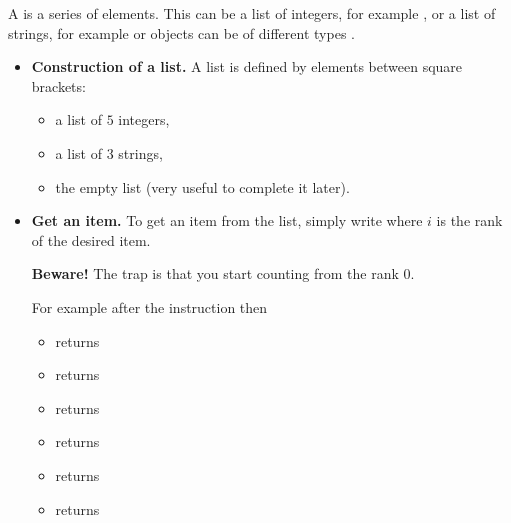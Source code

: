 \documentclass[11pt,class=report,crop=false]{standalone}
\begin{document}
\newcommand{\badletter}[1]{\underline{\underline{\textcolor{red}{#1}}}}






\begin{cours}[List (1)]

A  is a series of elements. This can be a list of integers, for example \ci{[5,-7,12,99]}, or a list of strings, for example  or objects can be of different types \ci{[3.14,"pi",10e-3,"x",True]}.

\begin{itemize}
  \item \textbf{Construction of a list.} A list is defined by elements between square brackets:
  \begin{itemize}
    \item {} a list of $5$ integers,
    \item {} a list of $3$ strings,
    \item {} the empty list (very useful to complete it later).
  \end{itemize}

  \item \textbf{Get an item.} To get an item from the list, simply write  where $i$ is the rank of the desired item. 
  
  \textbf{Beware!} The trap is that you start counting from the rank $0$. 
  
  For example after the instruction  then  
  \begin{itemize}
    \item {} returns 
    \item {} returns 
    \item {} returns 
    \item {} returns 
    \item {} returns 
    \item {} returns                    
  \end{itemize}  
  

\end{itemize}
\end{cours}
\end{document}

